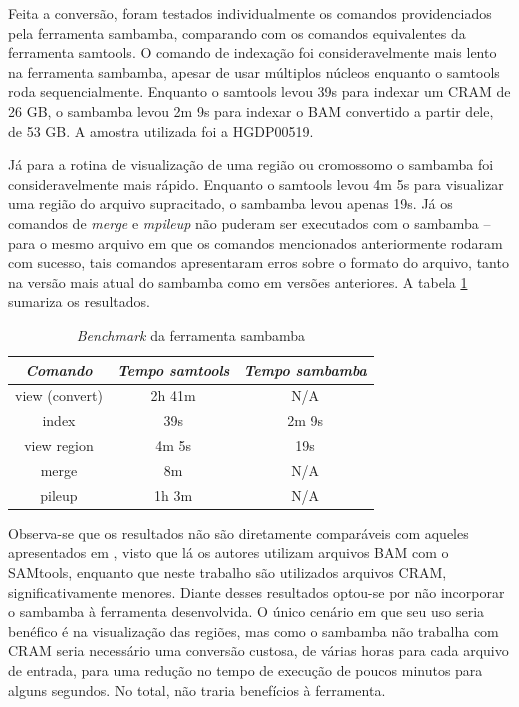 \documentclass[cic,tc]{iiufrgs}
\begin{document}
Feita a conversão, foram testados individualmente os comandos providenciados
pela ferramenta sambamba, comparando com os comandos equivalentes da ferramenta
samtools. O comando de indexação foi consideravelmente mais lento na ferramenta
sambamba, apesar de usar múltiplos núcleos enquanto o samtools roda
sequencialmente. Enquanto o samtools levou 39s para indexar um CRAM de 26 GB, o
sambamba levou 2m 9s para indexar o BAM convertido a partir dele, de 53 GB. A
amostra utilizada foi a HGDP00519.

Já para a rotina de visualização de uma região ou cromossomo o sambamba foi
consideravelmente mais rápido. Enquanto o samtools levou 4m 5s para visualizar
uma região do arquivo supracitado, o sambamba levou apenas 19s. Já os comandos
de \textit{merge} e \textit{mpileup} não puderam ser executados com o sambamba
-- para o mesmo arquivo em que os comandos mencionados anteriormente rodaram
com sucesso, tais comandos apresentaram erros sobre o formato do arquivo, tanto
na versão mais atual do sambamba como em versões anteriores. A tabela
\ref{tbl:sambamba} sumariza os resultados.

\begin{table}[h]
  \caption{\textit{Benchmark} da ferramenta sambamba}
    \centering
        \begin{tabular}{c|c|c}
          \hline
          \textit{Comando}  &   \textit{Tempo samtools}  & \textit{Tempo sambamba} \\
          \hline
          \hline
          view (convert) & 2h 41m & N/A \\
          index & 39s & 2m 9s \\
          view region & 4m 5s & 19s \\
          merge & 8m & N/A \\
          pileup & 1h 3m & N/A \\
          \hline
        \end{tabular}
    \label{tbl:sambamba}
\end{table}

Observa-se que os resultados não são diretamente comparáveis com aqueles
apresentados em \cite{tarasov2015sambamba}, visto que lá os autores utilizam
arquivos BAM com o SAMtools, enquanto que neste trabalho são utilizados
arquivos CRAM, significativamente menores. Diante desses resultados optou-se
por não incorporar o sambamba à ferramenta desenvolvida. O único cenário em que
seu uso seria benéfico é na visualização das regiões, mas como o sambamba não
trabalha com CRAM seria necessário uma conversão custosa, de várias horas para
cada arquivo de entrada, para uma redução no tempo de execução de poucos
minutos para alguns segundos. No total, não traria benefícios à ferramenta.
\end{document}
